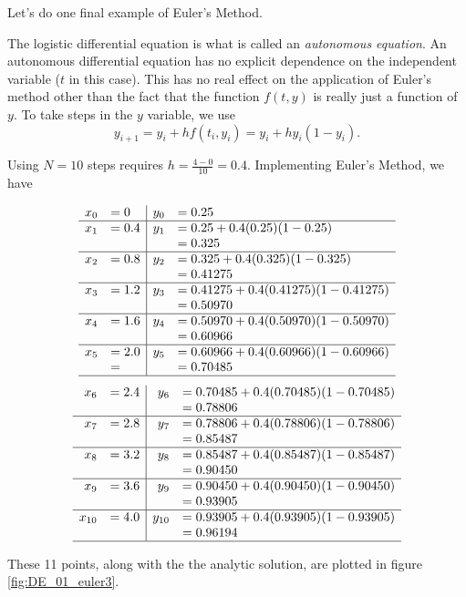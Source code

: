 Let's do one final example of Euler's Method.\\

{The logistic differential equation is what is called an \emph{autonomous equation}.  An autonomous differential equation  has no explicit dependence on the independent variable ($t$ in this case).  This has no real effect on the application of Euler's method other than the fact that the function $f(t,y)$ is really just a function of $y$.  To take steps in the $y$ variable, we use
\[y_{i+1} = y_i + hf(t_i,y_i) = y_i + hy_i(1-y_i).\]

Using $N=10$ steps requires $\displaystyle h = \frac{4-0}{10} = 0.4.$  Implementing Euler's Method, we have

\[
\begin{array}{rl | rl}
x_0  &= 0			& 	y_0	&= 0.25\\ \hline
x_1 	&= 0.4		&	y_1 	&= 0.25 + 0.4(0.25)(1-0.25)\\
	&			&		&= 0.325\\ \hline
x_2 	&= 0.8 		& 	y_2 	&= 0.325 + 0.4(0.325)(1-0.325)\\
	&			&		&= 0.41275\\ \hline
x_3	&= 1.2		&	y_3 	&= 0.41275 + 0.4(0.41275)(1-0.41275)\\
	&			&		&= 0.50970\\ \hline
x_4	&= 1.6		&	y_4	&= 0.50970 + 0.4(0.50970)(1 - 0.50970)\\
	&			&		&= 0.60966\\ \hline
x_5  &= 2.0		& 	y_5	&= 0.60966 + 0.4(0.60966)(1-0.60966)\\
	&=			&		&=  0.70485\\ \hline
\end{array}
\]
\[
\begin{array}{rl | rl}
x_6 	&= 2.4		&	y_6 	&= 0.70485 + 0.4(0.70485)(1 - 0.70485)\\
	&			&		&= 0.78806\\ \hline
x_7 	&= 2.8 		& 	y_7 	&= 0.78806 + 0.4(0.78806)(1-0.78806)\\
	&			&		&= 0.85487\\ \hline
x_8	&= 3.2		&	y_8 	&= 0.85487 + 0.4(0.85487)(1-0.85487)\\
	&			&		&= 0.90450\\ \hline
x_9	&= 3.6		&	y_9	&= 0.90450 + 0.4(0.90450)(1 - 0.90450)\\
	&			&		&= 0.93905\\ \hline
x_{10}&= 4.0		&	y_{10}&= 0.93905 + 0.4(0.93905)(1 - 0.93905)\\
	&			&		&= 0.96194\\ \hline
\end{array}
\]

These 11 points, along with the  the analytic solution, are plotted in figure \ref{fig:DE_01_euler3}.
}\\

